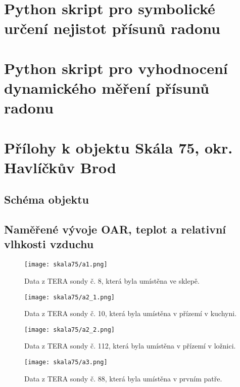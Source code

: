 \appendix
\chapter{Python skript pro symbolické určení nejistot přísunů radonu}\label{navesti:priloha_nejistoty}


\chapter{Python skript pro vyhodnocení dynamického měření přísunů radonu}\label{navesti:priloha_dynamickeMereni}

\chapter{Přílohy k objektu Skála 75, okr. Havlíčkův Brod}
\section{Schéma objektu}\label{navesti:priloha_skala75}

\section{Naměřené vývoje OAR, teplot a relativní vlhkosti vzduchu}
\begin{figure}[H]
    \centering
    \texttt{[image: skala75/a1.png]}
    \caption{Data z TERA sondy č. 8, která byla umístěna ve sklepě.}
    \label{fig:skala75_a1}
\end{figure}
\begin{figure}[H]
    \centering
    \texttt{[image: skala75/a2\_1.png]}
    \caption{Data z TERA sondy č. 10, která byla umístěna v přízemí v kuchyni.}
    \label{fig:skala75_a2_1}
\end{figure}
\begin{figure}[H]
    \centering
    \texttt{[image: skala75/a2\_2.png]}
    \caption{Data z TERA sondy č. 112, která byla umístěna v přízemí v ložnici.}
    \label{fig:skala75_a2_2}
\end{figure}
\begin{figure}[H]
    \centering
    \texttt{[image: skala75/a3.png]}
    \caption{Data z TERA sondy č. 88, která byla umístěna v prvním patře.}
    \label{fig:skala75_a3}
\end{figure}

